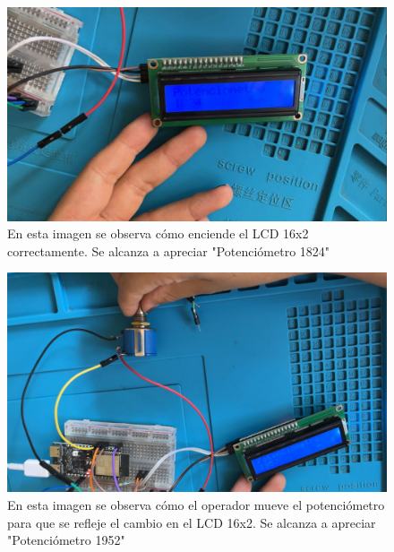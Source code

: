 \begin{enumerate}
\begin{figure}[H]
        \centering
        \includegraphics[trim = {1mm 1mm 1mm 1mm},clip,scale=0.4]{3/Img/evidencia3.png}
        \caption{En esta imagen se observa cómo enciende el LCD 16x2 correctamente. Se alcanza a apreciar "Potenciómetro 1824"} 
        \label{fig:evidencia3}
    \end{figure}
    \begin{figure}[H]
        \centering
        \includegraphics[trim = {1mm 1mm 1mm 1mm},clip,scale=0.4]{3/Img/evidencia4.png}
        \caption{En esta imagen se observa cómo el operador mueve el potenciómetro para que se refleje el cambio en el LCD 16x2. Se alcanza a apreciar "Potenciómetro 1952"} 
        \label{fig:evidencia4}
    \end{figure}
    \end{enumerate}

